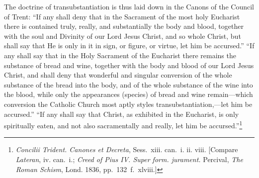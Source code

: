 \documentclass[
  english,
]{book}
\providecommand{\textlatin}{}
\renewcommand{\textlatin}[2][]{\foreignlanguage{latin}{#2}}
\begin{document}
The doctrine of transubstantiation is thus laid down in the Canons of the Council of Trent: ``If any shall deny that in the Sacrament of the most holy Eucharist there is contained truly, really, and substantially the body and blood, together with the soul and Divinity of our Lord Jesus Christ, and so whole Christ, but shall say that He is only in it in sign, or figure, or virtue, let him be accursed.'' ``If any shall say that in the Holy Sacrament of the Eucharist there remains the substance of bread and wine, together with the body and blood of our Lord Jesus Christ, and shall deny that wonderful and singular conversion of the whole substance of the bread into the body, and of the whole substance of the wine into the blood, while only the appearances (species) of bread and wine remain---which conversion the Catholic Church most aptly styles transubstantiation,---let him be accursed.'' ``If any shall say that Christ, as exhibited in the Eucharist, is only spiritually eaten, and not also sacramentally and really, let him be accursed.''\footnote{\textlatin{\emph{Concilii Trident. Canones et Decreta}}, Sess.~xiii. can.~i. ii. viii. {[}Compare \emph{Lateran}, iv. can.~i.; \emph{Creed of Pius IV. Super form. jurament.} Percival, \emph{The Roman Schism}, Lond. 1836, pp.~132~f.~xlviii.{]}}
\end{document}
